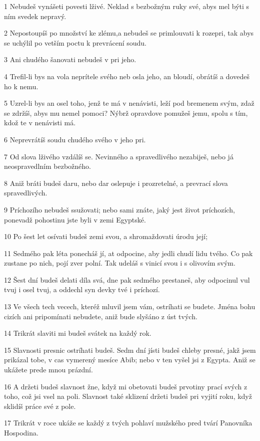 \par 1 Nebudeš vynášeti povesti lživé. Neklad s bezbožným ruky své, abys mel býti s ním svedek nepravý.
\par 2 Nepostoupíš po množství ke zlému,a nebudeš se primlouvati k rozepri, tak abys se uchýlil po vetším poctu k prevrácení soudu.
\par 3 Ani chudého šanovati nebudeš v pri jeho.
\par 4 Trefil-li bys na vola neprítele svého neb osla jeho, an bloudí, obrátíš a dovedeš ho k nemu.
\par 5 Uzrel-li bys an osel toho, jenž te má v nenávisti, leží pod bremenem svým, zdaž se zdržíš, abys mu nemel pomoci? Nýbrž opravdove pomužeš jemu, spolu s tím, kdož te v nenávisti má.
\par 6 Neprevrátíš soudu chudého svého v jeho pri.
\par 7 Od slova lživého vzdálíš se. Nevinného a spravedlivého nezabiješ, nebo já neospravedlním bezbožného.
\par 8 Aniž bráti budeš daru, nebo dar oslepuje i prozretelné, a prevrací slova spravedlivých.
\par 9 Príchozího nebudeš ssužovati; nebo sami znáte, jaký jest život príchozích, ponevadž pohostinu jste byli v zemi Egyptské.
\par 10 Po šest let osívati budeš zemi svou, a shromaždovati úrodu její;
\par 11 Sedmého pak léta ponecháš jí, at odpocine, aby jedli chudí lidu tvého. Co pak zustane po nich, pojí zver polní. Tak udeláš s vinicí svou i s olivovím svým.
\par 12 Šest dní budeš delati díla svá, dne pak sedmého prestaneš, aby odpocinul vul tvuj i osel tvuj, a oddechl syn devky tvé i príchozí.
\par 13 Ve všech tech vecech, kteréž mluvil jsem vám, ostríhati se budete. Jména bohu cizích ani pripomínati nebudete, aniž bude slyšáno z úst tvých.
\par 14 Trikrát slaviti mi budeš svátek na každý rok.
\par 15 Slavnosti presnic ostríhati budeš. Sedm dní jísti budeš chleby presné, jakž jsem prikázal tobe, v cas vymerený mesíce Abib; nebo v ten vyšel jsi z Egypta. Aniž se ukážete prede mnou prázdní.
\par 16 A držeti budeš slavnost žne, když mi obetovati budeš prvotiny prací svých z toho, což jsi vsel na poli. Slavnost také sklizení držeti budeš pri vyjití roku, když sklidíš práce své z pole.
\par 17 Trikrát v roce ukáže se každý z tvých pohlaví mužského pred tvárí Panovníka Hospodina.
